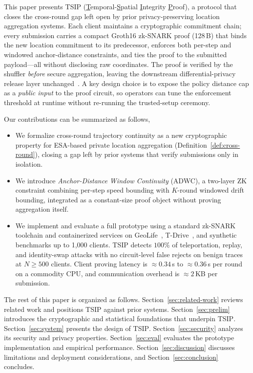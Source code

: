 \documentclass[conference]{IEEEtran}
\theoremstyle{definition}
\theoremstyle{plain}
\begin{document}
This paper presents \textsc{TSIP}
(\underline{T}emporal-\underline{S}patial
\underline{I}ntegrity \underline{P}roof),
a protocol that closes the cross-round gap left open by
prior privacy-preserving location aggregation systems.
Each client maintains a cryptographic commitment chain; every submission
carries a compact Groth16 zk-SNARK proof
(128\,B) that binds the new location commitment to its predecessor,
enforces both per-step and windowed anchor-distance constraints, and
ties the proof to the submitted payload---all without disclosing raw
coordinates.
The proof is verified by the shuffler \emph{before} secure aggregation,
leaving the downstream differential-privacy release layer
unchanged~\cite{Corrigan2017Prio,Balle2019privacy}.
A key design choice is to expose the policy distance cap as a
\emph{public input} to the proof circuit, so operators can tune
the enforcement threshold at runtime without re-running the trusted-setup
ceremony.

Our contributions can be summarized as follows,
\begin{itemize}
\item
We formalize cross-round trajectory continuity
as a new cryptographic property for ESA-based private location aggregation
(Definition~\ref{def:cross-round}), closing a gap left by prior systems that
verify submissions only in isolation.


\item
We introduce \emph{Anchor-Distance Window Continuity} (ADWC), a
two-layer ZK constraint combining per-step speed bounding with
$K$-round windowed drift bounding, integrated as a constant-size
proof object without proving aggregation itself.

\item
We implement and evaluate a full prototype using a standard
zk-SNARK toolchain and containerized services on
GeoLife~\cite{Zheng2010GeoLife}, T-Drive~\cite{Yuan2010Tdrive}, and
synthetic benchmarks up to 1{,}000 clients.
\textsc{TSIP} detects $100\%$ of teleportation, replay, and
identity-swap attacks with no circuit-level false rejects on benign
traces at $N\!\geq\!500$ clients.
Client proving latency is $\approx\!0.34$\,s to
$\approx\!0.36$\,s per round on a commodity CPU,
and communication overhead is $\approx\!2$\,KB per submission.
\end{itemize}

The rest of this paper is organized as follows.
Section~\ref{sec:related-work} reviews related work and positions
\textsc{TSIP} against prior systems.
Section~\ref{sec:prelim}  introduces the cryptographic and statistical foundations
that underpin \textsc{TSIP}.
Section~\ref{sec:system} presents the design of \textsc{TSIP}.
Section~\ref{sec:security} analyzes its security and privacy properties.
Section~\ref{sec:eval} evaluates the prototype implementation and
empirical performance.
Section~\ref{sec:discussion} discusses limitations and deployment
considerations, and Section~\ref{sec:conclusion} concludes.
\end{document}
